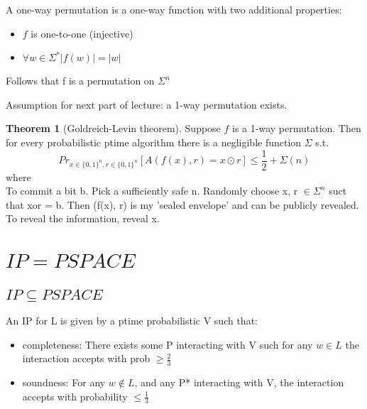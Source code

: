 \documentclass[a4paper,12pt]{article}
\theoremstyle{definition}
\newtheorem{theorem}[counter]{Theorem}
\theoremstyle{remark}
\begin{document}
A one-way permutation is a one-way function with two additional properties:
\begin{itemize}
    \item $f$ is one-to-one (injective)
    \item $\forall w \in \Sigma^* |f(w)| = |w|$
\end{itemize}

Follows that f is a permutation on $\Sigma^n$ %

Assumption for next part of lecture: a 1-way permutation exists.

\begin{theorem}[Goldreich-Levin theorem]
    Suppose $f$ is a 1-way permutation. Then for every probabilistic ptime algorithm there is a negligible function 
    $\Sigma$ s.t.
    \begin{equation*}
        Pr_{x \in \{0, 1\}^n, r \in \{0, 1\}^n} [A(f(x), r) = x \odot r] \leq \frac{1}{2} + \Sigma(n)
    \end{equation*}
    where
    \begin{equation*}
        [x \odot r = \sum_{i=1}^{n} x_i r_i mod 2]
    \end{equation*}
    To commit a bit b. 
    Pick a sufficiently safe n.
    Randomly choose x, r $\in \Sigma^n$ suct that xor = b.
    Then (f(x), r) is my 'sealed envelope' and can be publicly revealed.
    To reveal the information, reveal x.
\end{theorem}








\newpage
\section{$IP = PSPACE$}
\subsection{$IP \subseteq PSPACE$}
An IP for L is given by a ptime probabilistic V such that:
\begin{itemize}
    \item completeness: There exists some P interacting with V such for any $w \in L$ the interaction accepts with prob $\geq \frac{2}{3}$
    \item soundness: For any $w \notin L$, and any P* interacting with V, the interaction accepts with probability $\leq \frac{1}{3}$  
\end{itemize}
\end{document}
